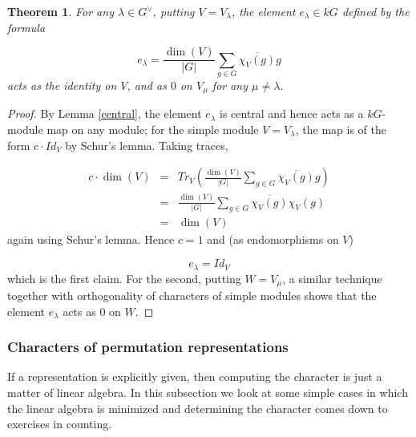 \documentclass[12pt,titlepage]{article}
\newcommand{\itexarray}[1]{\begin{matrix}#1\end{matrix}}
\newcommand{\widebar}{\overline}
\theoremstyle{plain}
\newtheorem{theorem}{Theorem}
\theoremstyle{definition}
\theoremstyle{remark}
\begin{document}
\begin{theorem}
\label{}\hypertarget{}{}
For any $\lambda \in G^\vee$, putting $V = V_\lambda$, the element $e_\lambda \in k G$ defined by the formula

\begin{displaymath}
e_\lambda = \frac{\dim(V)}{{|G|}} \sum_{g \in G} \widebar{\chi_V(g)} g
\end{displaymath}
acts as the identity on $V$, and as $0$ on $V_\mu$ for any $\mu \neq \lambda$.

\end{theorem}
\begin{proof}
By Lemma \ref{central}, the element $e_\lambda$ is central and hence acts as a $k G$-module map on any module; for the simple module $V = V_\lambda$, the map is of the form $c \cdot Id_V$ by Schur's lemma. Taking traces,

\begin{displaymath}
\itexarray{
c \cdot \dim(V) & = & Tr_V \left(\frac{\dim(V)}{{|G|}} \sum_{g \in G} \widebar{\chi_V(g)} g\right) \\ 
 & = & \frac{\dim(V)}{{|G|}} \sum_{g \in G} \widebar{\chi_V(g)} \chi_V(g) \\ 
 & = & \dim(V) 
}
\end{displaymath}
again using Schur's lemma. Hence $c = 1$ and (as endomorphisms on $V$)

\begin{displaymath}
e_\lambda = Id_V
\end{displaymath}
which is the first claim. For the second, putting $W = V_\mu$, a similar technique together with orthogonality of characters of simple modules shows that the element $e_\lambda$ acts as $0$ on $W$.

\end{proof}
\hypertarget{characters_of_permutation_representations}{}\subsubsection*{{Characters of permutation representations}}\label{characters_of_permutation_representations}

If a representation is explicitly given, then computing the character is just a matter of linear algebra. In this subsection we look at some simple cases in which the linear algebra is minimized and determining the character comes down to exercises in counting.
\end{document}
